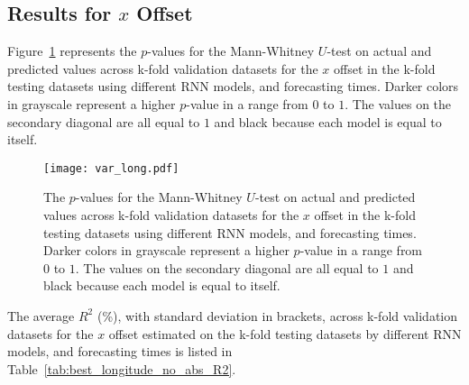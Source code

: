\subsection{Results for $x$ Offset}

Figure~\ref{fig:var_long} represents the $p$-values for the Mann-Whitney $U$-test on actual and predicted values across k-fold validation datasets for the $x$ offset in the k-fold testing datasets using different RNN models, and forecasting times. Darker colors in grayscale represent a higher $p$-value in a range from $0$ to $1$. The values on the secondary diagonal are all equal to $1$ and black because each model is equal to itself.

\begin{figure}[!ht]
	\centering
	\texttt{[image: var\_long.pdf]}
	\caption{The $p$-values for the Mann-Whitney $U$-test on actual and predicted values across k-fold validation datasets for the $x$ offset in the k-fold testing datasets using different RNN models, and forecasting times. Darker colors in grayscale represent a higher $p$-value in a range from $0$ to $1$. The values on the secondary diagonal are all equal to $1$ and black because each model is equal to itself.}
	\label{fig:var_long}
\end{figure}

The average $R^{2}$ (\%), with standard deviation in brackets, across k-fold validation datasets for the $x$ offset estimated on the k-fold testing datasets by different RNN models, and forecasting times is listed in Table~\ref{tab:best_longitude_no_abs_R2}.

